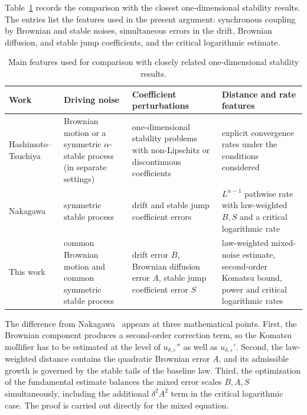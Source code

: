 \documentclass[11pt]{article}
\newcommand{\1}{\mathbf{1}}
\newcommand{\eps}{\varepsilon}
\begin{document}
Table~\ref{tab:comparison} records the comparison with the closest one-dimensional stability results. The entries list the features used in the present argument: synchronous coupling by Brownian and stable noises, simultaneous errors in the drift, Brownian diffusion, and stable jump coefficients, and the critical logarithmic estimate.
\begin{table}[h]
\centering
\small
\begin{tabular}{>{\raggedright\arraybackslash}p{}
          >{\raggedright\arraybackslash}p{}
          >{\raggedright\arraybackslash}p{}
          >{\raggedright\arraybackslash}p{}}
\hline
Work & Driving noise & Coefficient perturbations & Distance and rate features \\
\hline
Hashimoto--Tsuchiya~\cite{HashimotoTsuchiya2014} & Brownian motion or a symmetric $\alpha$-stable process (in separate settings) & one-dimensional stability problems with non-Lipschitz or discontinuous coefficients & explicit convergence rates under the conditions considered \\
Nakagawa~\cite{Nakagawa2026} & symmetric stable process & drift and stable jump coefficient errors & $L^{\alpha-1}$ pathwise rate with law-weighted $B,S$ and a critical logarithmic rate \\
This work & common Brownian motion and common symmetric stable process & drift error $B$, Brownian diffusion error $A$, stable jump coefficient error $S$ & law-weighted mixed-noise estimate, second-order Komatsu bound, power and critical logarithmic rates \\
\hline
\end{tabular}
\caption{Main features used for comparison with closely related one-dimensional stability results.}
\label{tab:comparison}
\end{table}

The difference from Nakagawa~\cite{Nakagawa2026} appears at three mathematical points. First, the Brownian component produces a second-order correction term, so the Komatsu mollifier has to be estimated at the level of $u_{\delta,\eps}''$ as well as $u_{\delta,\eps}'$. Second, the law-weighted distance contains the quadratic Brownian error $A$, and its admissible growth is governed by the stable tails of the baseline law. Third, the optimization of the fundamental estimate balances the mixed error scales $B,A,S$ simultaneously, including the additional $\delta^2 A^2$ term in the critical logarithmic case. The proof is carried out directly for the mixed equation.
\end{document}
